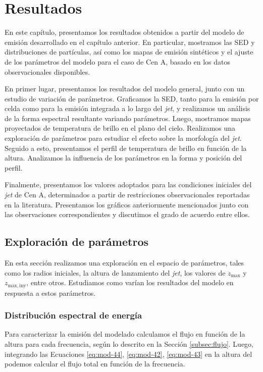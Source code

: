 \chapter{Resultados}\label{cha:resultados}

	En este capítulo, presentamos los resultados obtenidos a partir del modelo de emisión desarrollado en el capítulo anterior.
	En particular, mostramos las SED y distribuciones de partículas, as\'i como los mapas de emisión sintéticos y el ajuste de los parámetros del modelo para el caso de Cen A, basado en los datos observacionales disponibles.

	En primer lugar, presentamos los resultados del modelo general, junto con un estudio de variación de parámetros.
	Graficamos la SED, tanto para la emisión por celda como para la emisión integrada a lo largo del \textit{jet}, y realizamos un análisis de la forma espectral resultante variando parámetros. 
	Luego, mostramos mapas proyectados de temperatura de brillo en el plano del cielo.
	Realizamos una exploración de parámetros para estudiar el efecto sobre la morfología del \textit{jet}.
	Seguido a esto, presentamos el perfil de temperatura de brillo en funci\'on de la altura.
	Analizamos la influencia de los parámetros en la forma y posición del perfil.

	Finalmente, presentamos los valores adoptados para las condiciones iniciales del \textit{jet} de Cen A, determinados a partir de restricciones observacionales reportadas en la literatura.
	Presentamos los gráficos anteriormente mencionados junto con las observaciones correspondientes y discutimos el grado de acuerdo entre ellos.


\section{Exploración de parámetros}

	En esta secci\'on realizamos una exploraci\'on en el espacio de parámetros, tales como los radios iniciales, la altura de lanzamiento del \textit{jet}, los valores de $z_\mathrm{max}$ y $z_\mathrm{max,iny}$, entre otros.
	Estudiamos como varían los resultados del modelo en respuesta a estos parámetros.

\subsection{Distribución espectral de energía}

	Para caracterizar la emisión del \jet modelado calculamos el flujo en función de la altura para cada frecuencia, según lo descrito en la Sección \ref{subsec:flujo}.
	Luego, integrando las Ecuaciones \eqref{eq:mod-44}, \eqref{eq:mod-42}, \eqref{eq:mod-43} en la altura del \jet podemos calcular el flujo total en función de la frecuencia.


